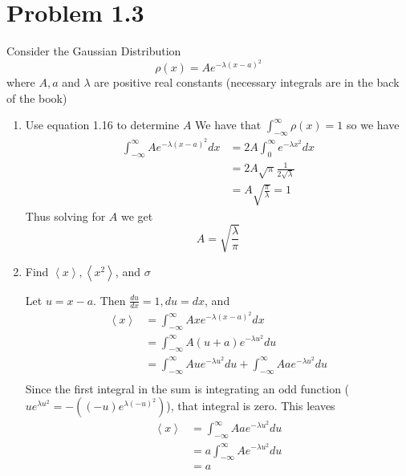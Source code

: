 \documentclass{article}
\newcommand{\braket}[1]{\left\langle #1 \right\rangle}
\newcommand{\intinf}{\int_{-\infty}^\infty}
\newcommand{\intzinf}{\int_{0}^\infty}
\begin{document}
\section{Problem 1.3}
  Consider the Gaussian Distribution
  \[
    \rho(x) = Ae^{-\lambda (x - a)^2}
  \]
  where $A, a$ and $\lambda$ are positive real constants (necessary integrals are in the back of the book)
  \begin{enumerate}[label=(\alph*)]
    \item Use equation 1.16 to determine $A$
      We have that $\intinf \rho(x) = 1$ so we have 
        \begin{align*}
          \intinf Ae^{-\lambda (x - a)^2} dx &= 2A\intzinf e^{-\lambda x^2} dx \\
                                                             &= 2A\sqrt{\pi}\frac1{2\sqrt{\lambda}} \\
                                                             &= A \sqrt{\frac\pi{\lambda}} = 1
        \end{align*}
        Thus solving for $A$ we get
        \[ A = \sqrt{\frac\lambda{\pi}} \]

    \item Find $\braket{x}, \braket{x^2}$, and $\sigma$
     
      Let $u = x-a$. Then $\frac{du}{dx} = 1, du = dx$, and
      \begin{align*}
        \braket{x} &= \intinf Axe^{-\lambda (x - a)^2}dx \\
                   &= \intinf A(u + a)e^{-\lambda u^2}du \\
                   &= \intinf Aue^{-\lambda u^2}du + \intinf Aae^{-\lambda u^2}du \\
      \end{align*}
      Since the first integral in the sum is integrating an odd function ($ue^{\lambda u^2} = -( (-u)e^{\lambda (-u)^2})$), that integral is zero. This leaves
      \begin{align*}
        \braket{x} &= \intinf Aae^{-\lambda u^2}du \\
                   &= a \intinf Ae^{-\lambda u^2}du \\
                   &= a
      \end{align*}
      

\end{enumerate}
\end{document}

